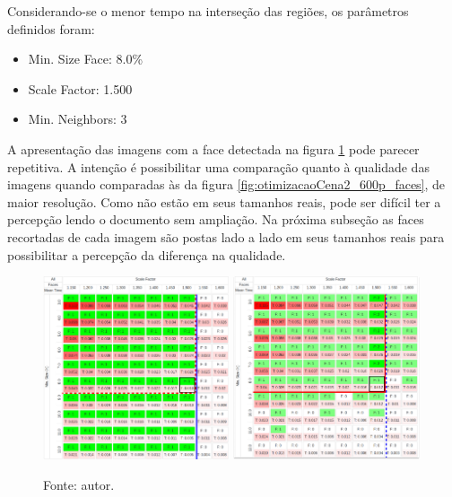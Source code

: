 Considerando-se o menor tempo na interseção das regiões, os parâmetros definidos foram: 
\begin{itemize}
    \SingleSpacing
    \item Min. Size Face: 8.0\%
    \item Scale Factor: 1.500
    \item Min. Neighbors: 3
\end{itemize}

A apresentação das imagens com a face detectada na figura \ref{fig:otimizacaoCena2_480p_matrizes} pode parecer repetitiva. A intenção é possibilitar uma comparação quanto à qualidade das imagens quando comparadas às da figura \ref{fig:otimizacaoCena2_600p_faces}, de maior resolução. Como não estão em seus tamanhos reais, pode ser difícil ter a percepção lendo o documento sem ampliação. Na próxima subseção as faces recortadas de cada imagem são postas lado a lado em seus tamanhos reais para possibilitar a percepção da diferença na qualidade.

\begin{figure}[H]
    \centering
    \caption[Otimização Cena 2 - resolução 480p - matrizes. À esquerda posição 1 e à direita, posição 2]{Otimização Cena 2 - resolução 480p - matrizes. À esquerda, posição 1, e à direita, posição 2.}
    \includegraphics[width=0.49\textwidth]{Cap4_Experimentos_Realizados/Figures/cena2_640x480_pos1_matriz.jpg}
    \includegraphics[width=0.49\textwidth]{Cap4_Experimentos_Realizados/Figures/cena2_640x480_pos2_matriz.jpg}
    \caption*{Fonte: autor.}
    \label{fig:otimizacaoCena2_480p_matrizes}
\end{figure}

